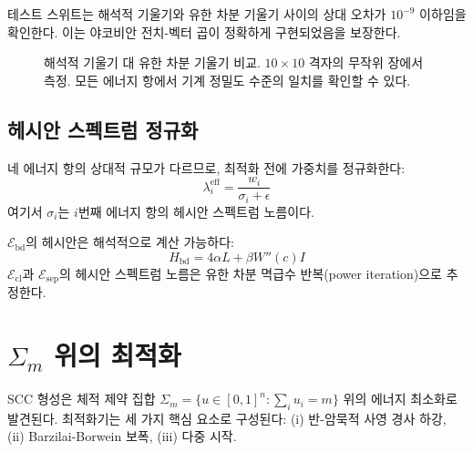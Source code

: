 테스트 스위트는 해석적 기울기와 유한 차분 기울기 사이의 상대 오차가 $10^{-9}$ 이하임을 확인한다. 이는 야코비안 전치-벡터 곱이 정확하게 구현되었음을 보장한다.

\begin{figure}[t]
\centering
\caption{해석적 기울기 대 유한 차분 기울기 비교. $10 \times 10$ 격자의 무작위 장에서 측정. 모든 에너지 항에서 기계 정밀도 수준의 일치를 확인할 수 있다.}
\label{fig:gradient-verification}
\end{figure}

\subsection{헤시안 스펙트럼 정규화}

네 에너지 항의 상대적 규모가 다르므로, 최적화 전에 가중치를 정규화한다:
\begin{equation}
    \lambda_i^{\mathrm{eff}} = \frac{w_i}{\sigma_i + \epsilon}
\end{equation}
여기서 $\sigma_i$는 $i$번째 에너지 항의 헤시안 스펙트럼 노름이다.

$\mathcal{E}_{\mathrm{bd}}$의 헤시안은 해석적으로 계산 가능하다:
\begin{equation}
    H_{\mathrm{bd}} = 4\alpha L + \beta W''(c) I
\end{equation}
$\mathcal{E}_{\mathrm{cl}}$과 $\mathcal{E}_{\mathrm{sep}}$의 헤시안 스펙트럼 노름은 유한 차분 멱급수 반복(power iteration)으로 추정한다.


\section{$\Sigma_m$ 위의 최적화}
\label{sec:optimization}

SCC 형성은 체적 제약 집합 $\Sigma_m = \{u \in [0,1]^n : \sum_i u_i = m\}$ 위의 에너지 최소화로 발견된다. 최적화기는 세 가지 핵심 요소로 구성된다: (i) 반-암묵적 사영 경사 하강, (ii) Barzilai-Borwein 보폭, (iii) 다중 시작.

